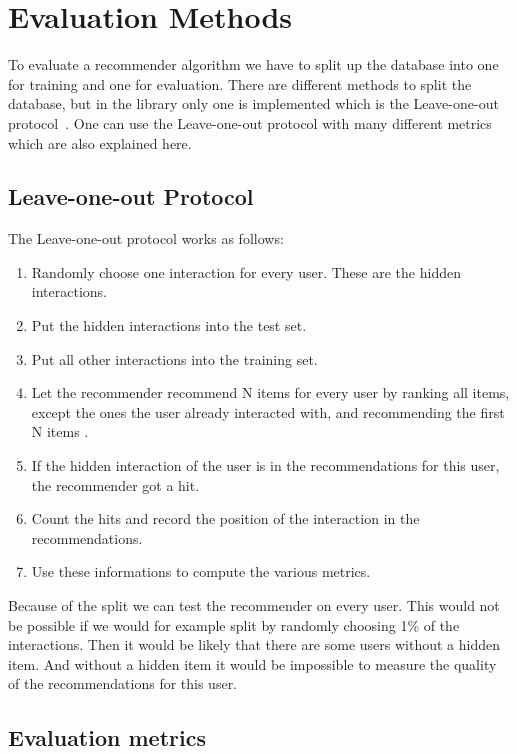 \section{Evaluation Methods}

To evaluate a recommender algorithm we have to split up the database
into one for training and one for evaluation. There are different
methods to split the database, but in the library only one is implemented
which is the Leave-one-out protocol~\cite{leaveoneout}.
One can use the Leave-one-out protocol with many different metrics
which are also explained here.


\subsection{Leave-one-out Protocol}
\label{leaveoneout}

The Leave-one-out protocol works as follows:
\begin{enumerate}
\item Randomly choose one interaction for every user. These are the hidden
interactions.
\item Put the hidden interactions into the test set.
\item Put all other interactions into the training set.
\item Let the recommender recommend N items for every user by ranking
all items, except the ones the user already interacted with,
and recommending the first N items .
\item If the hidden interaction of the user is in the recommendations
for this user, the recommender got a hit.
\item Count the hits and record the position of the interaction in the 
recommendations.
\item Use these informations to compute the various metrics.

\end{enumerate}
Because of the split we can test the recommender on every user.
This would not be possible
if we would for example split by randomly choosing 1\% of the interactions.
Then it would be likely that there are some users without a hidden item.
And without a hidden item it would be impossible to measure the quality
of the recommendations for this user.




\subsection{Evaluation metrics}
\label{evaluationmetrics}

